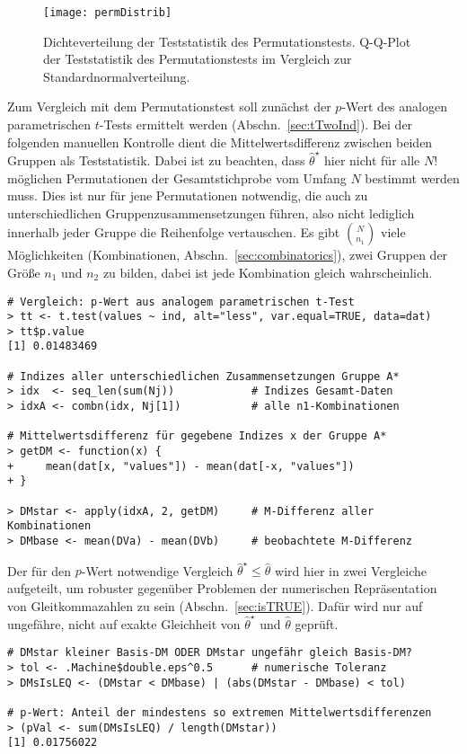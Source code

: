 \begin{figure}[ht]
\centering
\texttt{[image: permDistrib]}
\vspace*{-1em}
\caption{Dichteverteilung der Teststatistik des Permutationstests. Q-Q-Plot der Teststatistik des Permutationstests im Vergleich zur Standardnormalverteilung.}
\label{fig:permDistrib}
\end{figure}

Zum Vergleich mit dem Permutationstest soll zunächst der $p$-Wert des analogen parametrischen $t$-Tests ermittelt werden (Abschn.\ \ref{sec:tTwoInd}). Bei der folgenden manuellen Kontrolle dient die Mittelwertsdifferenz zwischen beiden Gruppen als Teststatistik. Dabei ist zu beachten, dass $\hat{\theta}^{\star}$ hier nicht für alle $N!$ möglichen Permutationen der Gesamtstichprobe vom Umfang $N$ bestimmt werden muss. Dies ist nur für jene Permutationen notwendig, die auch zu unterschiedlichen Gruppenzusammensetzungen führen, also nicht lediglich innerhalb jeder Gruppe die Reihenfolge vertauschen. Es gibt $N \choose n_{1}$ viele Möglichkeiten (Kombinationen, Abschn.\ \ref{sec:combinatorics}), zwei Gruppen der Größe $n_{1}$ und $n_{2}$ zu bilden, dabei ist jede Kombination gleich wahrscheinlich.
\begin{lstlisting}
# Vergleich: p-Wert aus analogem parametrischen t-Test
> tt <- t.test(values ~ ind, alt="less", var.equal=TRUE, data=dat)
> tt$p.value
[1] 0.01483469

# Indizes aller unterschiedlichen Zusammensetzungen Gruppe A*
> idx  <- seq_len(sum(Nj))            # Indizes Gesamt-Daten
> idxA <- combn(idx, Nj[1])           # alle n1-Kombinationen

# Mittelwertsdifferenz für gegebene Indizes x der Gruppe A*
> getDM <- function(x) {
+     mean(dat[x, "values"]) - mean(dat[-x, "values"])
+ }

> DMstar <- apply(idxA, 2, getDM)     # M-Differenz aller Kombinationen
> DMbase <- mean(DVa) - mean(DVb)     # beobachtete M-Differenz
\end{lstlisting}

Der für den $p$-Wert notwendige Vergleich $\hat{\theta}^{\star} \leq \hat{\theta}$ wird hier in zwei Vergleiche aufgeteilt, um robuster gegenüber Problemen der numerischen Repräsentation von Gleitkommazahlen zu sein (Abschn.\ \ref{sec:isTRUE}). Dafür wird nur auf ungefähre, nicht auf exakte Gleichheit von $\hat{\theta}^{\star}$ und $\hat{\theta}$ geprüft.
\begin{lstlisting}
# DMstar kleiner Basis-DM ODER DMstar ungefähr gleich Basis-DM?
> tol <- .Machine$double.eps^0.5      # numerische Toleranz
> DMsIsLEQ <- (DMstar < DMbase) | (abs(DMstar - DMbase) < tol)

# p-Wert: Anteil der mindestens so extremen Mittelwertsdifferenzen
> (pVal <- sum(DMsIsLEQ) / length(DMstar))
[1] 0.01756022
\end{lstlisting}

